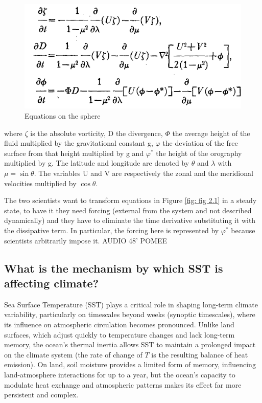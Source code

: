 \begin{figure}[h!]
	\centering
	\includegraphics[width=0.5\linewidth]{uploads/19image.png}
	\caption{Equations on the sphere}
	\label{fig: fig 2.2}

\end{figure}
where $\zeta$ is the absolute vorticity, D the divergence, $\Phi$
the average height of the fluid multiplied by the gravitational constant g, $\varphi$ the deviation of the free surface from that height multiplied by g and $\varphi^*$ the height of the orography multiplied by g. The latitude and longitude are denoted by $\theta$ and $\lambda$ with $\mu = \sin \theta$. The variables U and V are respectively the zonal and the meridional velocities multiplied by $\cos \theta$.


The two scientists want to transform equations in Figure \ref{fig: fig 2.1} in a steady state, to have it they need forcing (external from the system and not described dynamically) and they have to eliminate the time derivative substituting it with the dissipative term.
In particular, the forcing here is represented by $\varphi^*$ because scientists arbitrarily impose it.
AUDIO 48' POMEE




\subsection{What is the mechanism by which SST is affecting climate?}

Sea Surface Temperature (SST) plays a critical role in shaping long-term climate variability, particularly on timescales beyond weeks (synoptic timescales), where its influence on atmospheric circulation becomes pronounced. Unlike land surfaces, which adjust quickly to temperature changes and lack long-term memory, the ocean's thermal inertia allows SST to maintain a prolonged impact on the climate system (the rate of change of $T$ is the resulting balance of heat emission). On land, soil moisture provides a limited form of memory, influencing land-atmosphere interactions for up to a year, but the ocean’s capacity to modulate heat exchange and atmospheric patterns makes its effect far more persistent and complex.

